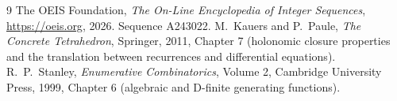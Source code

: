 \documentclass[11pt,a4paper]{article}
\theoremstyle{plain}
\theoremstyle{definition}
\begin{document}
\begin{thebibliography}{9}
 The OEIS Foundation, \emph{The On-Line Encyclopedia of Integer Sequences},
\url{https://oeis.org}, 2026. Sequence A243022.
 M.~Kauers and P.~Paule, \emph{The Concrete Tetrahedron}, Springer, 2011,
Chapter 7 (holonomic closure properties and the translation between recurrences and
differential equations).
 R.~P.~Stanley, \emph{Enumerative Combinatorics}, Volume 2, Cambridge
University Press, 1999, Chapter 6 (algebraic and D-finite generating functions).
\end{thebibliography}
\end{document}

